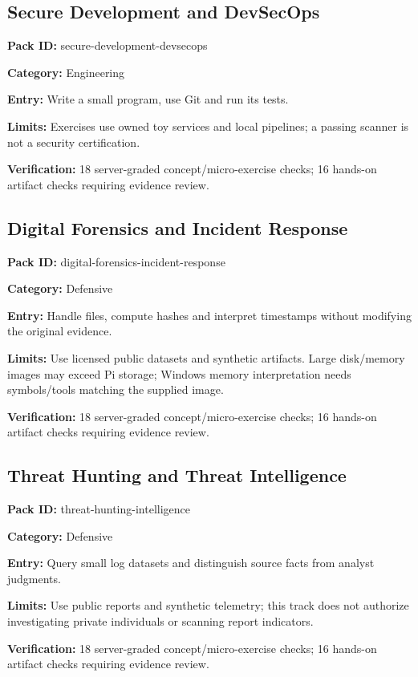 \subsection{Secure Development and DevSecOps}
\noindent\textbf{Pack ID:} secure-development-devsecops\par
\noindent\textbf{Category:} Engineering\par
\noindent\textbf{Entry:} Write a small program, use Git and run its tests.\par
\noindent\textbf{Limits:} Exercises use owned toy services and local pipelines; a passing scanner is not a security certification.\par
\noindent\textbf{Verification:} 18 server-graded concept/micro-exercise checks; 16 hands-on artifact checks requiring evidence review.\par
\subsection{Digital Forensics and Incident Response}
\noindent\textbf{Pack ID:} digital-forensics-incident-response\par
\noindent\textbf{Category:} Defensive\par
\noindent\textbf{Entry:} Handle files, compute hashes and interpret timestamps without modifying the original evidence.\par
\noindent\textbf{Limits:} Use licensed public datasets and synthetic artifacts. Large disk/memory images may exceed Pi storage; Windows memory interpretation needs symbols/tools matching the supplied image.\par
\noindent\textbf{Verification:} 18 server-graded concept/micro-exercise checks; 16 hands-on artifact checks requiring evidence review.\par
\subsection{Threat Hunting and Threat Intelligence}
\noindent\textbf{Pack ID:} threat-hunting-intelligence\par
\noindent\textbf{Category:} Defensive\par
\noindent\textbf{Entry:} Query small log datasets and distinguish source facts from analyst judgments.\par
\noindent\textbf{Limits:} Use public reports and synthetic telemetry; this track does not authorize investigating private individuals or scanning report indicators.\par
\noindent\textbf{Verification:} 18 server-graded concept/micro-exercise checks; 16 hands-on artifact checks requiring evidence review.\par
